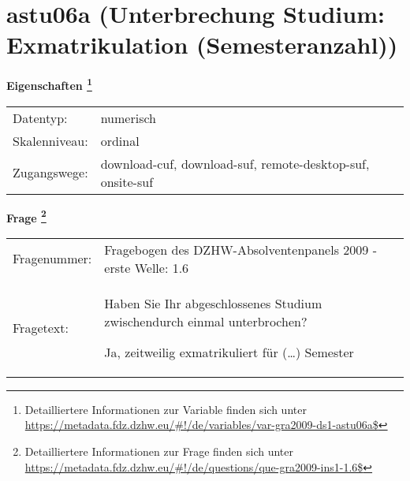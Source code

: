 
    \setcounter{footnote}{0}

    \vspace*{-1.8cm}
	\section{astu06a (Unterbrechung Studium: Exmatrikulation (Semesteranzahl))}
	\label{section:astu06a}



    \vspace*{0.5cm}
    \noindent\textbf{Eigenschaften
	\footnote{Detailliertere Informationen zur Variable finden sich unter
		\url{https://metadata.fdz.dzhw.eu/\#!/de/variables/var-gra2009-ds1-astu06a$}}}\\
	\begin{tabularx}{\hsize}{@{}lX}
	Datentyp: & numerisch \\
	Skalenniveau: & ordinal \\
	Zugangswege: &
	  download-cuf, 
	  download-suf, 
	  remote-desktop-suf, 
	  onsite-suf
 \\
    \end{tabularx}



				\vspace*{0.5cm}
                \noindent\textbf{Frage
	                \footnote{Detailliertere Informationen zur Frage finden sich unter
		              \url{https://metadata.fdz.dzhw.eu/\#!/de/questions/que-gra2009-ins1-1.6$}}}\\
				\begin{tabularx}{\hsize}{@{}lX}
					Fragenummer: &
					  Fragebogen des DZHW-Absolventenpanels 2009 - erste Welle:
					  1.6
 \\
					Fragetext: & Haben Sie Ihr abgeschlossenes Studium zwischendurch einmal unterbrochen?\par  Ja, zeitweilig exmatrikuliert für (…) Semester \\
				\end{tabularx}





